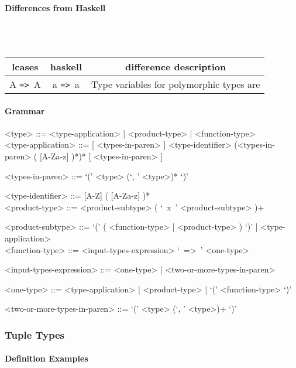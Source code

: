 \documentclass{article}
\def\ra{\texttt{=>}\ }
\def\pend{\mbox{} \\\\}
\begin{document}
\paragraph{Differences from Haskell}\pend
\begin{tabular}{ |c|c|c| } 
\hline
lcases & haskell & difference description \\ 
\hline
\hline
A \ra A & a \ra a & Type variables for polymorphic types are  \\ 
\hline
\end{tabular}

\paragraph{Grammar}
\begin{grammar}
<type> ::= <type-application> | <product-type> | <function-type> \\

<type-application> ::=
[ <types-in-paren> ] <type-identifier> (<types-in-paren> ( [A-Za-z] )*)* [ <types-in-paren> ] 

<types-in-paren> ::= `(' <type> (`, ' <type>)* `)'

<type-identifier> ::= [A-Z] ( [A-Za-z] )* \\ 
 
<product-type> ::= <product-subtype> ( `\ x\ ' <product-subtype> )+

<product-subtype> ::=
`(' ( <function-type> | <product-type> ) `)' | <type-application> \\

<function-type> ::= <input-types-expression> `\ =>\ ' <one-type>

<input-types-expression> ::= <one-type> | <two-or-more-types-in-paren>

<one-type> ::= <type-application> | <product-type> | `(' <function-type> `)'

<two-or-more-types-in-paren> ::=  `(' <type> (`, ' <type>)+ `)'
\end{grammar}

\subsubsection{Tuple Types}
\label{subsec:tupts}

\paragraph{Definition Examples}
\end{document}
